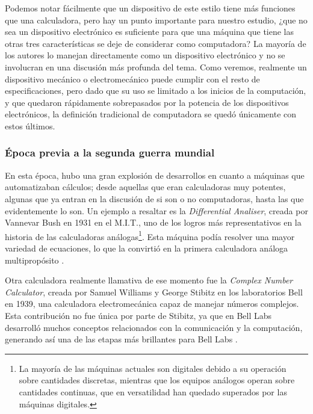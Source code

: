 \documentclass[letterpaper,12pt,oneside]{book}
\begin{document}
		Podemos notar fácilmente que un dispositivo de este estilo tiene más funciones que una calculadora, pero hay un punto importante para nuestro 
		estudio, ¿que no sea un dispositivo electrónico es
		suficiente para que una máquina que tiene las otras tres características se deje de considerar como computadora? La mayoría de los autores lo manejan directamente
		como un dispositivo electrónico y no se involucran en una discusión más profunda del tema. Como veremos, realmente un dispositivo mecánico o electromecánico
		puede cumplir con el resto de especificaciones, pero dado que su uso se limitado a los inicios de la computación, y que quedaron rápidamente sobrepasados por la potencia de los dispositivos electrónicos, la definición tradicional de computadora se quedó únicamente con estos últimos.
		
        \subsubsection{Época previa a la segunda guerra mundial}
		
		En esta época, hubo una gran explosión de desarrollos en cuanto a máquinas que automatizaban cálculos; desde
		aquellas que eran calculadoras muy potentes, algunas que ya entran en la discusión de si son o no computadoras, hasta las que evidentemente lo son. Un ejemplo a 
		resaltar es la \textit{Differential Analiser}, creada por Vannevar Bush en 1931 en el M.I.T., uno de los logros más representativos en la historia de las calculadoras
		análogas\footnote{La mayoría de las máquinas actuales son digitales debido a su operación sobre cantidades discretas, mientras que los equipos análogos operan
		sobre cantidades continuas, que en versatilidad han quedado superados por las máquinas digitales.}. Esta máquina podía resolver una mayor 
		variedad de ecuaciones, lo que la convirtió en la primera calculadora análoga multipropósito \cite[p.158]{ifrah_universal_2001}.
  
		Otra calculadora realmente llamativa de ese momento fue la \textit{Complex Number Calculator}, creada por		
		Samuel Williams y George Stibitz en los laboratorios Bell en 1939, una calculadora electromecánica capaz
		de manejar números complejos. Esta contribución no fue única por parte de Stibitz, ya que en Bell Labs desarrolló muchos conceptos relacionados con la
		comunicación y la computación, generando así una de las etapas más brillantes para Bell Labs \cite[p.207]{ifrah_universal_2001}.
		
\end{document}
